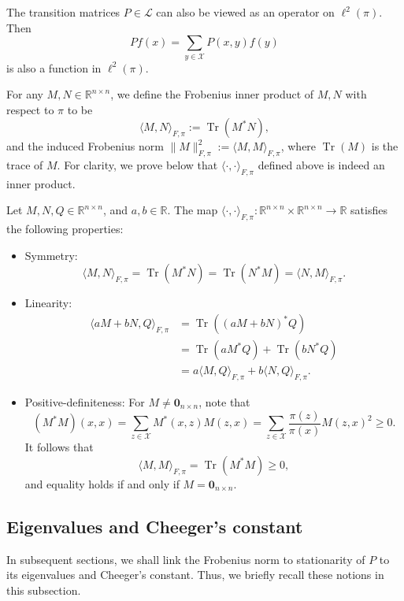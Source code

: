 \documentclass[EJP]{ejpecp} %
\DeclareMathOperator{\Tr}{Tr}
\begin{document}
The transition matrices $P \in \mathcal{L}$ can also be viewed as an operator on $\ell^2(\pi)$. Then 
$$Pf(x) = \sum_{y \in \mathcal{X}} P(x,y) f(y)$$
is also a function in $\ell^2(\pi)$.

For any $M, N \in \mathbb{R}^{n \times n}$, we define the Frobenius inner product of $M, N$ with respect to $\pi$ to be 
$$\langle M,N \rangle_{F,\pi} := \Tr(M^*N),$$
and the induced Frobenius norm $\| M\|_{F, \pi}^2 := \langle M,M\rangle_{F,\pi}$, where $\Tr(M)$ is the trace of $M$. For clarity, we prove below that $\langle \cdot,\cdot \rangle_{F,\pi}$ defined above is indeed an inner product.

    Let $M, N, Q \in \mathbb{R}^{n \times n}$, and $a,b \in \mathbb{R}$.
    The map $\langle \cdot,\cdot \rangle_{F,\pi}: \mathbb{R}^{n \times n} \times \mathbb{R}^{n \times n} \to \mathbb{R}$ satisfies the following properties:
    \begin{itemize}
        \item Symmetry: 
        $$\langle M, N \rangle_{F, \pi} = \Tr(M^*N) = \Tr(N^*M) = \langle N,M \rangle_{F, \pi}.$$

        \item Linearity: 
        \begin{align*}
            \langle aM+bN, Q \rangle_{F, \pi} &= \Tr((aM+bN)^* Q)\\
            &= \Tr(aM^*Q) + \Tr(bN^*Q)\\
            &= a\langle M, Q \rangle_{F, \pi} + b\langle N, Q \rangle_{F, \pi}.
        \end{align*}

        \item Positive-definiteness: For $M \neq \mathbf{0}_{n \times n}$, note that 
        $$(M^*M)(x,x) = \sum_{z\in \mathcal{X}} M^*(x,z) M(z,x) = \sum_{z\in \mathcal{X}} \frac{\pi(z)}{\pi(x)} M(z,x)^2 \geq 0.$$
        It follows that 
        $$\langle M,M \rangle_{F, \pi} = \Tr(M^*M) \geq 0,$$
        and equality holds if and only if $M = \mathbf{0}_{n \times n}.$
    \end{itemize}

\subsection{Eigenvalues and Cheeger's constant}

In subsequent sections, we shall link the Frobenius norm to stationarity of $P$ to its eigenvalues and Cheeger's constant. Thus, we briefly recall these notions in this subsection.
\end{document}
